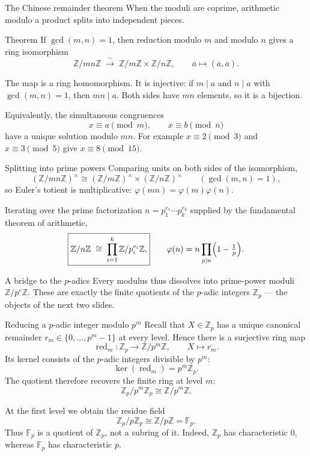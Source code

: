 \documentclass[aspectratio=169,11pt]{beamer}
\newcommand{\Z}{\mathbb Z}
\begin{document}
\begin{frame}{The Chinese remainder theorem}
  \small
  When the moduli are coprime, arithmetic modulo a product splits into
  independent pieces.

  \begin{block}{Theorem}
    If \(\gcd(m,n)=1\), then reduction modulo \(m\) and modulo \(n\) gives a
    ring isomorphism
    \[
      \boxed{\Z/mn\Z\;\xrightarrow{\ \sim\ }\;\Z/m\Z\times\Z/n\Z,
        \qquad
        \overline a\longmapsto(\overline a,\overline a).}
    \]
  \end{block}

  The map is a ring homomorphism.  It is injective: if \(m\mid a\) and
  \(n\mid a\) with \(\gcd(m,n)=1\), then \(mn\mid a\).  Both sides have
  \(mn\) elements, so it is a bijection.

  Equivalently, the simultaneous congruences
  \[
    x\equiv a\pmod m,
    \qquad
    x\equiv b\pmod n
  \]
  have a unique solution modulo \(mn\).  For example \(x\equiv2\pmod3\) and
  \(x\equiv3\pmod5\) give \(x\equiv8\pmod{15}\).
\end{frame}

\begin{frame}{Splitting into prime powers}
  \small
  Comparing units on both sides of the isomorphism,
  \[
    (\Z/mn\Z)^\times\cong(\Z/m\Z)^\times\times(\Z/n\Z)^\times
    \qquad(\gcd(m,n)=1),
  \]
  so Euler's totient is \alert{multiplicative}:
  \(\varphi(mn)=\varphi(m)\varphi(n)\).

  Iterating over the prime factorization
  \(n=p_1^{e_1}\cdots p_k^{e_k}\) supplied by the fundamental theorem of
  arithmetic,
  \[
    \boxed{\Z/n\Z\;\cong\;\prod_{i=1}^{k}\Z/p_i^{e_i}\Z,}
    \qquad
    \varphi(n)=n\prod_{p\mid n}\Bigl(1-\tfrac1p\Bigr).
  \]

  \begin{alertblock}{A bridge to the \(p\)-adics}
    Every modulus thus dissolves into \alert{prime-power} moduli
    \(\Z/p^{e}\Z\).  These are exactly the finite quotients of the
    \(p\)-adic integers \(\Z_p\) --- the objects of the next two slides.
  \end{alertblock}
\end{frame}

\begin{frame}{Reducing a \(p\)-adic integer modulo \(p^m\)}
  \small
  Recall that \(X\in\Z_p\) has a unique canonical remainder
  \(r_m\in\{0,\ldots,p^m-1\}\) at every level.  Hence there is a
  surjective ring map
  \[
    \operatorname{red}_m\colon\Z_p\longrightarrow\Z/p^m\Z,
    \qquad
    X\longmapsto\overline{r_m}.
  \]
  Its kernel consists of the \(p\)-adic integers divisible by \(p^m\):
  \[
    \ker(\operatorname{red}_m)=p^m\Z_p.
  \]
  The quotient therefore recovers the finite ring at level \(m\):
  \[
    \boxed{\Z_p/p^m\Z_p\cong\Z/p^m\Z.}
  \]

  At the first level we obtain the \alert{residue field}
  \[
    \boxed{\Z_p/p\Z_p\cong\Z/p\Z=\mathbb F_p.}
  \]
  Thus \(\mathbb F_p\) is a quotient of \(\Z_p\), not a subring of it.
  Indeed, \(\Z_p\) has characteristic \(0\), whereas \(\mathbb F_p\)
  has characteristic \(p\).
\end{frame}
\end{document}

